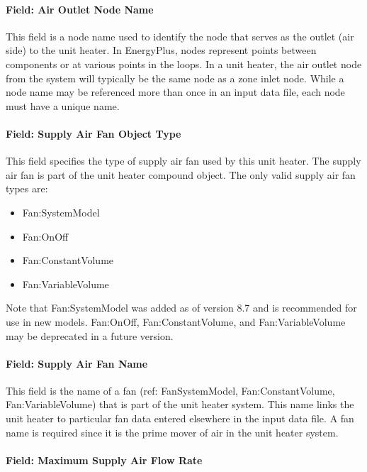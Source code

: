 \paragraph{Field: Air Outlet Node Name}\label{field-air-outlet-node-name-2-003}

This field is a node name used to identify the node that serves as the outlet (air side) to the unit heater. In EnergyPlus, nodes represent points between components or at various points in the loops. In a unit heater, the air outlet node from the system will typically be the same node as a zone inlet node. While a node name may be referenced more than once in an input data file, each node must have a unique name.

\paragraph{Field: Supply Air Fan Object Type}\label{field-supply-air-fan-object-type-2-000}

This field specifies the type of supply air fan used by this unit heater. The supply air fan is part of the unit heater compound object. The only valid supply air fan types are:

\begin{itemize}
\item
  Fan:SystemModel
\item
  Fan:OnOff
\item
  Fan:ConstantVolume
\item
  Fan:VariableVolume
\end{itemize}

Note that Fan:SystemModel was added as of version 8.7 and is recommended for use in new models.  Fan:OnOff, Fan:ConstantVolume, and Fan:VariableVolume may be deprecated in a future version.

\paragraph{Field: Supply Air Fan Name}\label{field-supply-air-fan-name-2-000}

This field is the name of a fan (ref: FanSystemModel, Fan:ConstantVolume, Fan:VariableVolume) that is part of the unit heater system. This name links the unit heater to particular fan data entered elsewhere in the input data file. A fan name is required since it is the prime mover of air in the unit heater system.

\paragraph{Field: Maximum Supply Air Flow Rate}\label{field-maximum-supply-air-flow-rate-2}

